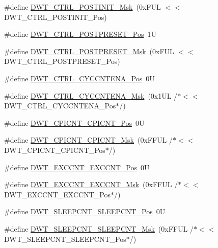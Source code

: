 \begin{DoxyCompactItemize}
\item 
\#define \hyperlink{group___c_m_s_i_s___d_w_t_gab8cbbee1e1d94d09f9a1f86379a08ee8}{D\+W\+T\+\_\+\+C\+T\+R\+L\+\_\+\+P\+O\+S\+T\+I\+N\+I\+T\+\_\+\+Msk}~(0x\+F\+U\+L $<$$<$ D\+W\+T\+\_\+\+C\+T\+R\+L\+\_\+\+P\+O\+S\+T\+I\+N\+I\+T\+\_\+\+Pos)
\item 
\#define \hyperlink{group___c_m_s_i_s___d_w_t_ga129bc152febfddd67a0c20c6814cba69}{D\+W\+T\+\_\+\+C\+T\+R\+L\+\_\+\+P\+O\+S\+T\+P\+R\+E\+S\+E\+T\+\_\+\+Pos}~1U
\item 
\#define \hyperlink{group___c_m_s_i_s___d_w_t_ga11d9e1e2a758fdd2657aa68ce61b9c9d}{D\+W\+T\+\_\+\+C\+T\+R\+L\+\_\+\+P\+O\+S\+T\+P\+R\+E\+S\+E\+T\+\_\+\+Msk}~(0x\+F\+U\+L $<$$<$ D\+W\+T\+\_\+\+C\+T\+R\+L\+\_\+\+P\+O\+S\+T\+P\+R\+E\+S\+E\+T\+\_\+\+Pos)
\item 
\#define \hyperlink{group___c_m_s_i_s___d_w_t_gaa4509f5f8514a7200be61691f0e01f10}{D\+W\+T\+\_\+\+C\+T\+R\+L\+\_\+\+C\+Y\+C\+C\+N\+T\+E\+N\+A\+\_\+\+Pos}~0U
\item 
\#define \hyperlink{group___c_m_s_i_s___d_w_t_ga4a9d209dc2a81ea6bfa0ea21331769d3}{D\+W\+T\+\_\+\+C\+T\+R\+L\+\_\+\+C\+Y\+C\+C\+N\+T\+E\+N\+A\+\_\+\+Msk}~(0x1\+U\+L /$\ast$$<$$<$ D\+W\+T\+\_\+\+C\+T\+R\+L\+\_\+\+C\+Y\+C\+C\+N\+T\+E\+N\+A\+\_\+\+Pos$\ast$/)
\item 
\#define \hyperlink{group___c_m_s_i_s___d_w_t_ga80e9ad8f6a9e2344af8a3cf989bebe3d}{D\+W\+T\+\_\+\+C\+P\+I\+C\+N\+T\+\_\+\+C\+P\+I\+C\+N\+T\+\_\+\+Pos}~0U
\item 
\#define \hyperlink{group___c_m_s_i_s___d_w_t_ga76f39e7bca3fa86a4dbf7b8f6adb7217}{D\+W\+T\+\_\+\+C\+P\+I\+C\+N\+T\+\_\+\+C\+P\+I\+C\+N\+T\+\_\+\+Msk}~(0x\+F\+F\+U\+L /$\ast$$<$$<$ D\+W\+T\+\_\+\+C\+P\+I\+C\+N\+T\+\_\+\+C\+P\+I\+C\+N\+T\+\_\+\+Pos$\ast$/)
\item 
\#define \hyperlink{group___c_m_s_i_s___d_w_t_ga031c693654030d4cba398b45d2925b1d}{D\+W\+T\+\_\+\+E\+X\+C\+C\+N\+T\+\_\+\+E\+X\+C\+C\+N\+T\+\_\+\+Pos}~0U
\item 
\#define \hyperlink{group___c_m_s_i_s___d_w_t_ga057fa604a107b58a198bbbadb47e69c9}{D\+W\+T\+\_\+\+E\+X\+C\+C\+N\+T\+\_\+\+E\+X\+C\+C\+N\+T\+\_\+\+Msk}~(0x\+F\+F\+U\+L /$\ast$$<$$<$ D\+W\+T\+\_\+\+E\+X\+C\+C\+N\+T\+\_\+\+E\+X\+C\+C\+N\+T\+\_\+\+Pos$\ast$/)
\item 
\#define \hyperlink{group___c_m_s_i_s___d_w_t_ga0371a84a7996dc5852c56afb2676ba1c}{D\+W\+T\+\_\+\+S\+L\+E\+E\+P\+C\+N\+T\+\_\+\+S\+L\+E\+E\+P\+C\+N\+T\+\_\+\+Pos}~0U
\item 
\#define \hyperlink{group___c_m_s_i_s___d_w_t_ga1e340751d71413fef400a0a1d76cc828}{D\+W\+T\+\_\+\+S\+L\+E\+E\+P\+C\+N\+T\+\_\+\+S\+L\+E\+E\+P\+C\+N\+T\+\_\+\+Msk}~(0x\+F\+F\+U\+L /$\ast$$<$$<$ D\+W\+T\+\_\+\+S\+L\+E\+E\+P\+C\+N\+T\+\_\+\+S\+L\+E\+E\+P\+C\+N\+T\+\_\+\+Pos$\ast$/)

\end{DoxyCompactItemize}

